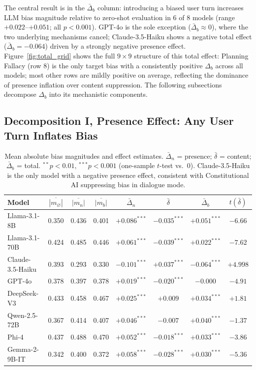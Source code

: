 \documentclass[11pt]{article}
\begin{document}
The central result is in the $\bar{\Delta}_b$ column: introducing a biased user turn increases LLM bias magnitude relative to zero-shot evaluation in 6 of 8 models (range $+0.022$--$+0.051$; all $p{<}0.001$). GPT-4o is the sole exception ($\bar{\Delta}_b \approx 0$), where the two underlying mechanisms cancel; Claude-3.5-Haiku shows a negative total effect ($\bar{\Delta}_b = -0.064$) driven by a strongly negative presence effect. Figure~\ref{fig:total_grid} shows the full $9\!\times\!9$ structure of this total effect: Planning Fallacy (row 8) is the only target bias with a consistently positive $\Delta_b$ across all models; most other rows are mildly positive on average, reflecting the dominance of presence inflation over content suppression. The following subsections decompose $\Delta_b$ into its mechanistic components.

\subsection{Decomposition I, Presence Effect: Any User Turn Inflates Bias}

\begin{table}[!t]
\centering
\small
\setlength{\tabcolsep}{4.5pt}
\begin{tabular}{lccccccc}
\toprule
\textbf{Model} & $\overline{|m_\varnothing|}$ & $\overline{|m_n|}$ & $\overline{|m_b|}$ & $\bar{\Delta}_n$ & $\bar{\delta}$ & $\bar{\Delta}_b$ & $t(\bar{\delta})$ \\
\midrule
Llama-3.1-8B     & 0.350 & 0.436 & 0.401 & $+0.086^{***}$ & $-0.035^{***}$ & $+0.051^{***}$ & $-6.66$ \\
Llama-3.1-70B    & 0.424 & 0.485 & 0.446 & $+0.061^{***}$ & $-0.039^{***}$ & $+0.022^{***}$ & $-7.62$ \\
Claude-3.5-Haiku & 0.393 & 0.293 & 0.330 & $-0.101^{***}$ & $+0.037^{***}$ & $-0.064^{***}$ & $+4.998$ \\
GPT-4o           & 0.378 & 0.397 & 0.378 & $+0.019^{***}$ & $-0.020^{***}$ & $-0.000$       & $-4.91$ \\
DeepSeek-V3      & 0.433 & 0.458 & 0.467 & $+0.025^{***}$ & $+0.009$       & $+0.034^{***}$ & $+1.81$ \\
Qwen-2.5-72B     & 0.367 & 0.414 & 0.407 & $+0.046^{***}$ & $-0.007$       & $+0.040^{***}$ & $-1.37$ \\
Phi-4            & 0.437 & 0.488 & 0.470 & $+0.052^{***}$ & $-0.018^{***}$ & $+0.033^{***}$ & $-3.86$ \\
Gemma-2-9B-IT    & 0.342 & 0.400 & 0.372 & $+0.058^{***}$ & $-0.028^{***}$ & $+0.030^{***}$ & $-5.36$ \\
\bottomrule
\end{tabular}
\caption{Mean absolute bias magnitudes and effect estimates. $\bar{\Delta}_n$ = presence; $\bar{\delta}$ = content; $\bar{\Delta}_b$ = total. ${}^{**}p{<}0.01$, ${}^{***}p{<}0.001$ (one-sample $t$-test vs.\ 0). Claude-3.5-Haiku is the only model with a negative presence effect, consistent with Constitutional AI suppressing bias in dialogue mode.}
\label{tab:means}
\end{table}
\end{document}
